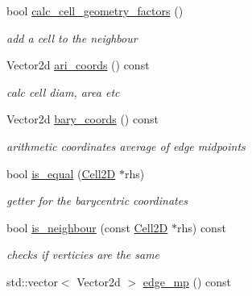 \begin{DoxyCompactItemize}
bool \hyperlink{classMeshFramework2D_1_1Cell2D_a5dd60b54738e447e922b8d4decfac5b2}{calc\+\_\+cell\+\_\+geometry\+\_\+factors} ()
\begin{DoxyCompactList}\small\item\em add a cell to the neighbour \end{DoxyCompactList}\item 
\mbox{\label{classMeshFramework2D_1_1Cell2D_adea88b0500005fa433bc4bb63b74a29b}} 
Vector2d \hyperlink{classMeshFramework2D_1_1Cell2D_adea88b0500005fa433bc4bb63b74a29b}{ari\+\_\+coords} () const
\begin{DoxyCompactList}\small\item\em calc cell diam, area etc \end{DoxyCompactList}\item 
\mbox{\label{classMeshFramework2D_1_1Cell2D_a82142fae2501ee78bb50771ddd7d5752}} 
Vector2d \hyperlink{classMeshFramework2D_1_1Cell2D_a82142fae2501ee78bb50771ddd7d5752}{bary\+\_\+coords} () const
\begin{DoxyCompactList}\small\item\em arithmetic coordinates average of edge midpoints \end{DoxyCompactList}\item 
\mbox{\label{classMeshFramework2D_1_1Cell2D_ad739eeff29a89ecfe392eaa5ef97c2d3}} 
bool \hyperlink{classMeshFramework2D_1_1Cell2D_ad739eeff29a89ecfe392eaa5ef97c2d3}{is\+\_\+equal} (\hyperlink{classMeshFramework2D_1_1Cell2D}{Cell2D} $\ast$rhs)
\begin{DoxyCompactList}\small\item\em getter for the barycentric coordinates \end{DoxyCompactList}\item 
bool \hyperlink{classMeshFramework2D_1_1Cell2D_a557da6f9e39c77c05bb2d42108d1728d}{is\+\_\+neighbour} (const \hyperlink{classMeshFramework2D_1_1Cell2D}{Cell2D} $\ast$rhs) const
\begin{DoxyCompactList}\small\item\em checks if verticies are the same \end{DoxyCompactList}\item 
std\+::vector$<$ Vector2d $>$ \hyperlink{classMeshFramework2D_1_1Cell2D_a556bc73467e350e7a323ff5f506fdc26}{edge\+\_\+mp} () const

\end{DoxyCompactItemize}
